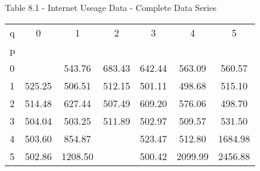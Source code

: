 \documentclass{article}
\begin{document}
\begin{center}
Table 8.1 - Internet Useage Data - Complete Data Series
\end{center}
\begin{center}
\begin{tabular}{ l c c c c c c} 
q & 0 & 1 & 2 & 3 & 4 & 5 \\
p & & & & & & \\
0 &   & 543.76 & 683.43 & 642.44 & 563.09 & 560.57 \\
1 & 525.25 & 506.51 & 512.15 & 501.11 & 498.68 & 515.10 \\
2 & 514.48 & 627.44 & 507.49 & 609.20 & 576.06 & 498.70 \\
3 & 504.04 & 503.25 & 511.89 & 502.97 & 509.57 & 531.50 \\
4 & 503.60 & 854.87 &   & 523.47 & 512.80 & 1684.98 \\
5 & 502.86 & 1208.50 &   & 500.42 & 2099.99 & 2456.88
\end{tabular}
\end{center}
\end{document}
